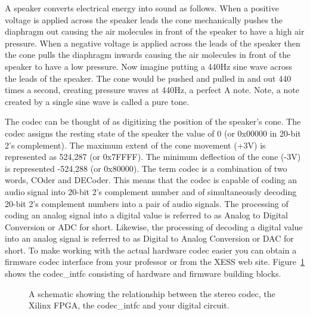 \begin{enumerate}
A speaker converts electrical energy into sound as follows.  When a positive 
voltage is applied across the speaker leads the cone mechanically pushes 
the diaphragm out causing the air molecules in front of the  speaker to 
have a high air pressure.  When a negative voltage is 
applied across the leads of the speaker then the cone pulls the diaphragm 
inwards causing the air molecules in front of the speaker to have a low 
pressure.  Now imagine putting a 440Hz
sine wave across the leads of the speaker. The cone would be pushed and 
pulled in and out 440 times a second, creating pressure waves at 440Hz,
a perfect A note.  Note, a note created by a single sine wave is called 
a pure tone.

The codec can be thought of as digitizing the position of the speaker's
cone.  The codec assigns the resting state of the speaker the value
of 0 (or 0x00000 in 20-bit 2's complement).  The maximum extent of the cone
movement (+3V) is represented as 524,287 (or 0x7FFFF).  The minimum deflection of 
the cone (-3V) is represented -524,288 (or 0x80000).  
 The term codec is a combination of two words, COder
and DECoder.  This means that the codec is capable of coding an audio signal
into 20-bit 2's complement number and of simultaneously decoding 20-bit 2's
complement numbers into a pair of audio signals.   The processing of coding an analog
signal into a digital value is referred to as Analog to Digital Conversion or
ADC for short.  Likewise, the processing of decoding a digital value into an
analog signal is referred to as Digital to Analog Conversion or DAC for short.
To make working with the actual hardware codec easier you can obtain a firmware 
codec interface from your professor or from the XESS web site.  Figure~\ref{fig:codec} 
shows the codec\_intfc consisting of hardware and firmware 
building blocks. 

\begin{figure}[ht]
\caption{A schematic showing the relationship between the stereo codec,
the Xilinx FPGA, the codec\_intfc and your digital circuit.}
\label{fig:codec}
\end{figure}



\end{enumerate}

